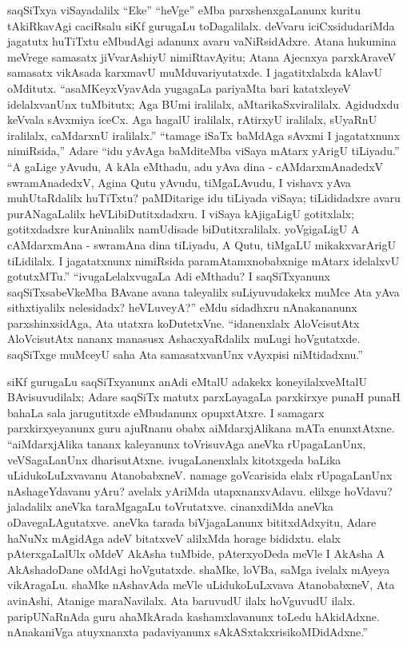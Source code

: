 saqSiTxya viSayadalilx ``Eke'' ``heVge'' eMba parxshenxgaLanunx kuritu tAkiRkavAgi caciRsalu siKf gurugaLu toDagalilalx. deVvaru iciCxsidudariMda jagatutx huTiTxtu eMbudAgi adanunx avaru vaNiRsidAdxre. Atana hukumina meVrege samasatx jiVvarAshiyU nimiRtavAyitu; Atana Ajecnxya parxkAraveV samasatx vikAsada karxmavU muMduvariyutatxde. I jagatitxlalxda kAlavU oMditutx. ``asaMKeyxVyavAda yugagaLa pariyaMta bari katatxleyeV idelalxvanUnx tuMbitutx; Aga BUmi iralilalx, aMtarikaSxviralilalx. Agidudxdu keVvala sAvxmiya iceCx. Aga hagalU iralilalx, rAtirxyU iralilalx, sUyaRnU iralilalx, caMdarxnU iralilalx.'' ``tamage iSaTx baMdAga sAvxmi I jagatatxnunx nimiRsida,'' Adare ``idu yAvAga baMditeMba viSaya mAtarx yArigU tiLiyadu.'' ``A gaLige yAvudu, A kAla eMthadu, adu yAva dina - cAMdarxmAnadedxV swramAnadedxV, Agina Qutu yAvudu, tiMgaLAvudu, I vishavx yAva muhUtaRdalilx huTiTxtu? paMDitarige idu tiLiyada viSaya; tiLididadxre avaru purANagaLalilx heVLibiDutitxdadxru. I viSaya kAjigaLigU gotitxlalx; gotitxdadxre kurAninalilx namUdisade biDutitxralilalx. yoVgigaLigU A cAMdarxmAna - swramAna dina tiLiyadu, A Qutu, tiMgaLU mikakxvarArigU tiLidilalx. I jagatatxnunx nimiRsida paramAtamxnobabxnige mAtarx idelalxvU gotutxMTu.'' ``ivugaLelalxvugaLa Adi eMthadu? I saqSiTxyanunx saqSiTxsabeVkeMba BAvane avana taleyalilx suLiyuvudakekx muMce Ata yAva sithxtiyalilx nelesidadx? heVLuveyA?'' eMdu sidadhxru nAnakananunx parxshinxsidAga, Ata utatxra koDutetxVne. ``idanenxlalx AloVcisutAtx AloVcisutAtx nananx manasusx AshacxyaRdalilx muLugi hoVgutatxde. saqSiTxge muMceyU saha Ata samasatxvanUnx vAyxpisi niMtidadxnu.''

siKf gurugaLu saqSiTxyanunx anAdi eMtalU adakekx koneyilalxveMtalU BAvisuvudilalx; Adare saqSiTx matutx parxLayagaLa parxkirxye punaH punaH bahaLa sala jarugutitxde eMbudanunx opupxtAtxre. I samagarx parxkirxyeyanunx guru ajuRnanu obabx aiMdarxjAlikana mATa enunxtAtxne. ``aiMdarxjAlika tananx kaleyanunx toVrisuvAga aneVka rUpagaLanUnx, veVSagaLanUnx dharisutAtxne. ivugaLanenxlalx kitotxgeda baLika uLidukoLuLxvavanu AtanobabxneV. namage goVcarisida elalx rUpagaLanUnx nAshageYdavanu yAru? avelalx yAriMda utapxnanxvAdavu. elilxge hoVdavu? jaladalilx aneVka taraMgagaLu toVrutatxve. cinanxdiMda aneVka oDavegaLAgutatxve. aneVka tarada biVjagaLanunx bititxdAdxyitu, Adare haNuNx mAgidAga adeV bitatxveV alilxMda horage bididxtu. elalx pAterxgaLalUlx oMdeV AkAsha tuMbide, pAterxyoDeda meVle I AkAsha A AkAshadoDane oMdAgi hoVgutatxde. shaMke, loVBa, saMga ivelalx mAyeya vikAragaLu. shaMke nAshavAda meVle uLidukoLuLxvava AtanobabxneV, Ata avinAshi, Atanige maraNavilalx. Ata baruvudU ilalx hoVguvudU ilalx. paripUNaRnAda guru ahaMkArada kashamxlavanunx toLedu hAkidAdxne. nAnakaniVga atuyxnanxta padaviyanunx sAkASxtakxrisikoMDidAdxne.''

